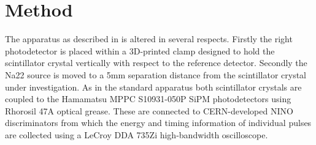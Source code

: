 \section{Method}
The apparatus as described in \cite{arron_Meyer_Pauwels_Lecoq_2012} is altered in several respects. Firstly the right photodetector is placed within a 3D-printed clamp designed to hold the scintillator crystal vertically with respect to the reference detector. Secondly the Na22 source is moved to a 5mm separation distance from the scintillator crystal under investigation. As in the standard apparatus both scintillator crystals are coupled to the Hamamatsu MPPC S10931-050P SiPM photodetectors using Rhorosil 47A optical grease. These are connected to CERN-developed NINO discriminators from which the energy and timing information of individual pulses are collected using a LeCroy DDA 735Zi high-bandwidth oscilloscope.